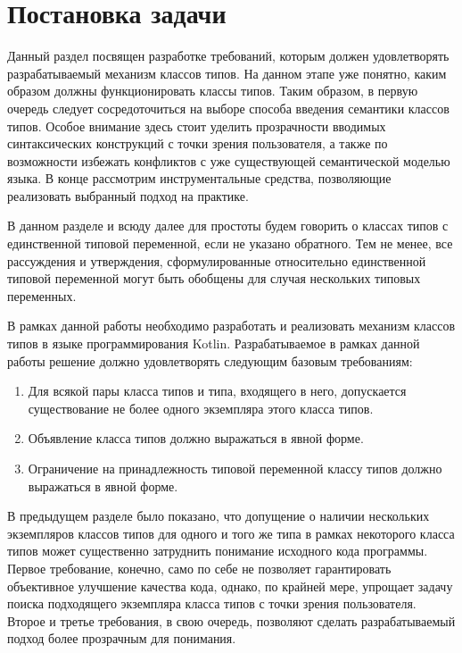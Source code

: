 \chapter{Постановка задачи}

Данный раздел посвящен разработке требований, которым должен удовлетворять разрабатываемый механизм классов типов. На данном этапе уже понятно, каким образом должны функционировать классы типов. Таким образом, в первую очередь следует сосредоточиться на выборе способа введения семантики классов типов. Особое внимание здесь стоит уделить прозрачности вводимых синтаксических конструкций с точки зрения пользователя, а также по возможности избежать конфликтов с уже существующей семантической моделью языка. В конце рассмотрим инструментальные средства, позволяющие реализовать выбранный подход на практике.

В данном разделе и всюду далее для простоты будем говорить о классах типов с единственной типовой переменной, если не указано обратного. Тем не менее, все рассуждения и утверждения, сформулированные относительно единственной типовой переменной могут быть обобщены для случая нескольких типовых переменных.

В рамках данной работы необходимо разработать и реализовать механизм классов типов в языке программирования Kotlin. Разрабатываемое в рамках данной работы решение должно удовлетворять следующим базовым требованиям:
\begin{enumerate}
    \item Для всякой пары класса типов и типа, входящего в него, допускается существование не более одного экземпляра этого класса типов.
    \item Объявление класса типов должно выражаться в явной форме.
    \item Ограничение на принадлежность типовой переменной классу типов должно выражаться в явной форме.
\end{enumerate} 
В предыдущем разделе было показано, что допущение о наличии нескольких экземпляров классов типов для одного и того же типа в рамках некоторого класса типов может существенно затруднить понимание исходного кода программы. Первое требование, конечно, само по себе не позволяет гарантировать объективное улучшение качества кода, однако, по крайней мере, упрощает задачу поиска подходящего экземпляра класса типов с точки зрения пользователя. Второе и третье требования, в свою очередь, позволяют сделать разрабатываемый подход более прозрачным для понимания. 


